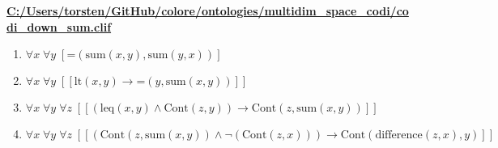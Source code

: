 \documentclass{article}
\begin{document}
\textbf{\url{C:/Users/torsten/GitHub/colore/ontologies/multidim\_space\_codi/codi\_down\_sum.clif}}

\begin{enumerate}
\item $\forall x\; \forall y\;  \left[ \textrm{=}(\textrm{sum}(x,y),\textrm{sum}(y,x)) \right]$
\item $\forall x\; \forall y\;  \left[ \left[ \textrm{lt}(x,y) \rightarrow \textrm{=}(y,\textrm{sum}(x,y)) \right] \right]$
\item $\forall x\; \forall y\; \forall z\;  \left[ \left[ \left(\textrm{leq}(x,y) \land \textrm{Cont}(z,y)\right) \rightarrow \textrm{Cont}(z,\textrm{sum}(x,y)) \right] \right]$
\item $\forall x\; \forall y\; \forall z\;  \left[ \left[ \left(\textrm{Cont}(z,\textrm{sum}(x,y)) \land \neg \left(\textrm{Cont}(z,x)\right)\right) \rightarrow \textrm{Cont}(\textrm{difference}(z,x),y) \right] \right]$
\end{enumerate}
\end{document}
